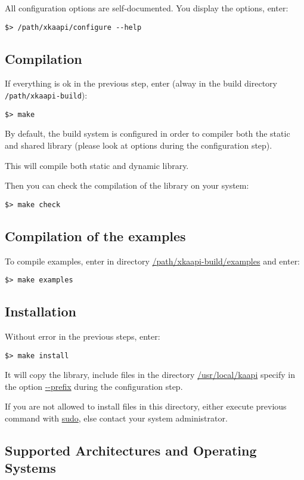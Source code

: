 \documentclass{article}
\begin{document}
All configuration options are self-documented. You display the options, enter:
\begin{verbatim}
$> /path/xkaapi/configure --help
\end{verbatim}


\subsection{Compilation}
If everything is ok in the previous step, enter (alway in the build directory \verb+/path/xkaapi-build+):
\begin{verbatim}
$> make
\end{verbatim}

By default, the build system is configured in order to compiler both the static and shared library (please look at options during the configuration step).

This will compile both static and dynamic library. 

Then you can check the compilation of the library on your system:
\begin{verbatim}
$> make check
\end{verbatim}

\subsection{Compilation of the examples}
To compile examples, enter in directory \url{/path/xkaapi-build/examples} and enter:
\begin{verbatim}
$> make examples
\end{verbatim}

\subsection{Installation}
Without error in the previous steps, enter:
\begin{verbatim}
$> make install
\end{verbatim}
It will copy the library, include files in the directory \url{/usr/local/kaapi} specify in the option \url{--prefix} during the
configuration step.

If you are not allowed to install files in this directory, either execute previous command with \url{sudo}, else
contact your system administrator.

\subsection{Supported Architectures and Operating Systems}
\end{document}

